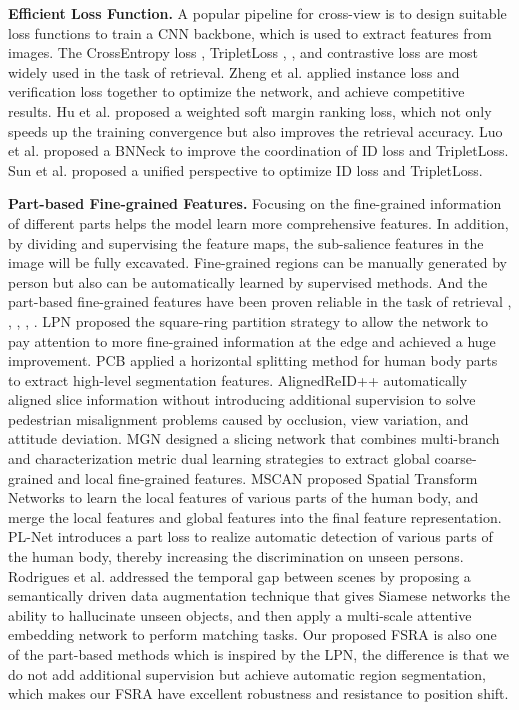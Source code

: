 \documentclass[lettersize,journal]{IEEEtran}
\begin{document}
\textbf{Efficient Loss Function.} A popular pipeline for cross-view is to design suitable loss functions to train a CNN backbone, which is used to extract features from images. The CrossEntropy loss \cite{ref28}, TripletLoss \cite{ref29}, \cite{ref30}, and contrastive loss \cite{ref31} are most widely used in the task of retrieval. Zheng et al. \cite{ref32} applied instance loss and verification loss together to optimize the network, and achieve competitive results. Hu et al. \cite{ref33} proposed a weighted soft margin ranking loss, which not only speeds up the training convergence but also improves the retrieval accuracy. Luo et al. \cite{ref34} proposed a BNNeck to improve the coordination of ID loss and TripletLoss. Sun et al. \cite{ref35} proposed a unified perspective to optimize ID loss and TripletLoss.

\textbf{Part-based Fine-grained Features.} Focusing on the fine-grained information of different parts helps the model learn more comprehensive features. In addition, by dividing and supervising the feature maps, the sub-salience features in the image will be fully excavated. Fine-grained regions can be manually generated by person but also can be automatically learned by supervised methods. And the part-based fine-grained features have been proven reliable in the task of retrieval \cite{ref36}, \cite{ref37}, \cite{ref38}, \cite{ref39}, \cite{ref40}. LPN \cite{ref11} proposed the square-ring partition strategy to allow the network to pay attention to more fine-grained information at the edge and achieved a huge improvement. PCB \cite{ref17} applied a horizontal splitting method for human body parts to extract high-level segmentation features. AlignedReID++ \cite{ref21} automatically aligned slice information without introducing additional supervision to solve pedestrian misalignment problems caused by occlusion, view variation, and attitude deviation. MGN \cite{ref18} designed a slicing network that combines multi-branch and characterization metric dual learning strategies to extract global coarse-grained and local fine-grained features. MSCAN \cite{ref18} proposed Spatial Transform Networks to learn the local features of various parts of the human body, and merge the local features and global features into the final feature representation. PL-Net \cite{ref20} introduces a part loss to realize automatic detection of various parts of the human body, thereby increasing the discrimination on unseen persons. Rodrigues et al.\cite{ref53} addressed the temporal gap between scenes by proposing a semantically driven data augmentation technique that gives Siamese networks the ability to hallucinate unseen objects, and then apply a multi-scale attentive embedding network to perform matching tasks. Our proposed FSRA is also one of the part-based methods which is inspired by the LPN, the difference is that we do not add additional supervision but achieve automatic region segmentation, which makes our FSRA have excellent robustness and resistance to position shift.
\end{document}

